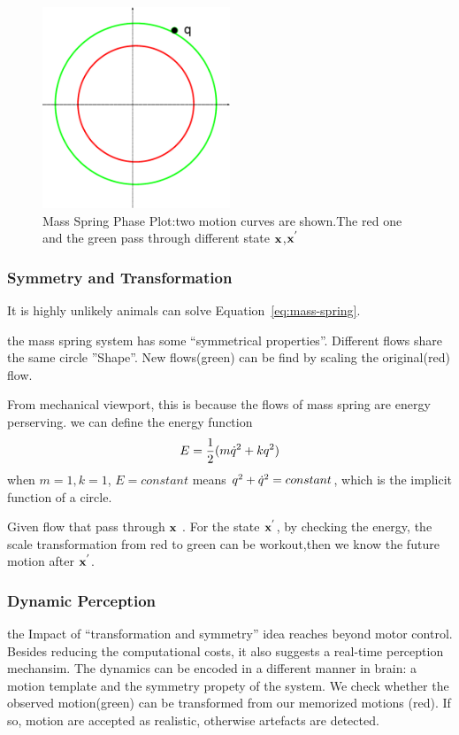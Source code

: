 \begin{figure}[!htbp]
\label{fig:massSpringPhasePlot}  
  \begin{center}
     \includegraphics[width=0.5\textwidth]{MassSpringPhasePlot}
    \caption{Mass Spring Phase Plot:two motion curves are shown.The red one and the green pass through different state $\mathbf{x}$,$\mathbf{x}^{'}$}
  \end{center}
\end{figure}

\subsubsection*{Symmetry and Transformation}
It is highly unlikely animals can solve Equation~\ref{eq:mass-spring}.

the mass spring system has some ``symmetrical properties''.
Different flows share the same circle ''Shape''.
New flows(green) can be find by scaling the original(red) flow.

From mechanical viewport, this is because the flows of mass spring are energy perserving.
we can define the energy function
\[
E=\frac{1}{2}(m\dot{q}^2+kq^2)
\]
when $m=1,k=1$, $E=constant$ means $q^2+\dot{q}^2=constant$, which is the implicit function of a circle.

Given flow that pass through  $\mathbf{x}$ .
For the state $\mathbf{x}^{'}$, by checking the energy, the scale transformation from red to green can be workout,then we know the future motion after $\mathbf{x}^{'}$.


\subsubsection*{Dynamic Perception}
the Impact of ``transformation and symmetry'' idea reaches beyond motor control. 
Besides reducing the computational costs, it also suggests a real-time perception mechansim.
The dynamics can be encoded in a different manner in brain: a motion template and the symmetry propety of the system.
We check whether the observed motion(green) can be transformed from our memorized motions (red).
If so, motion are accepted as realistic, otherwise artefacts are detected.


